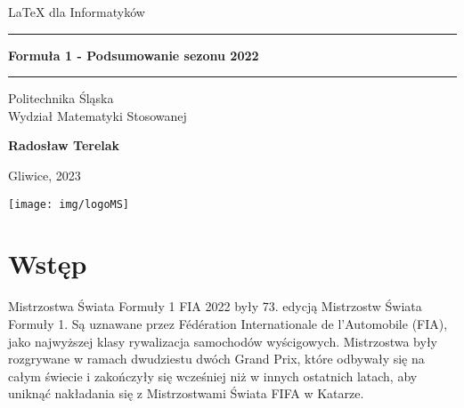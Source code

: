 \documentclass[12pt]{article}
\newcommand{\mytitle}{Formuła 1 - Podsumowanie sezonu 2022}
\newcommand{\myname}{Radosław Terelak}
\begin{document}
 
\begin{titlepage}
\begin{center}
    
\LARGE
LaTeX dla Informatyków
    
\vspace{0.5cm}
      
\rule{\textwidth}{1.5pt}
\LARGE
\textbf{\mytitle}
\rule{\textwidth}{1.5pt}
   
\vspace{0.5cm}
      
\large
Politechnika Śląska\\
Wydział Matematyki Stosowanej

\vfill

\Large
\textbf{\myname}

\vfill

\large
Gliwice, 2023
      
\vfill

\texttt{[image: img/logoMS]}

\vfill

\end{center}
\end{titlepage}


\newpage
\tableofcontents
\begin{abstract}
    Niniejszy artykuł podsumowuje wydarzenia z wyścigów Formuły 1 sezonu 2022. Znajdują się tu tabele z klasyfikacjami mistrzostw, kalendarzem wszystkich odbytych wyścigów jak i najważniejsze informacje oraz subiektywne zdanie na temat wygranych i przegranych rywalizacji w tym roku. 
\end{abstract}

    
\newpage
\section{Wstęp}
Mistrzostwa Świata Formuły 1 FIA 2022 były 73. edycją Mistrzostw Świata Formuły 1. Są uznawane przez Fédération Internationale de l'Automobile (FIA), jako najwyższej klasy rywalizacja samochodów wyścigowych. Mistrzostwa były rozgrywane w ramach dwudziestu dwóch Grand Prix, które odbywały się na całym świecie i zakończyły się wcześniej niż w innych ostatnich latach, aby uniknąć nakładania się z Mistrzostwami Świata FIFA w Katarze.\\
\end{document}
